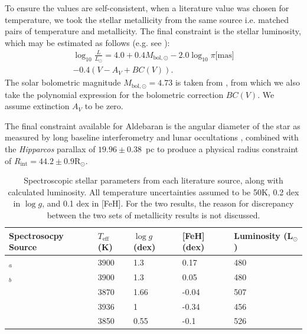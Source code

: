 \documentclass[modern]{aastex61}
\newcommand{\hipparcos}{\emph{Hipparcos}\xspace}
\begin{document}
To ensure the values are self-consistent, when a literature value was chosen for temperature, we took the stellar metallicity from the same source i.e. matched pairs of temperature and metallicity. The final constraint is the stellar luminosity, which may be estimated as follows (e.g. see \citealt{pijpers2003}):
\begin{multline}
\log_{10} \frac{L}{L_{\odot}} = 4.0+
0.4 M_{{\textrm{bol}},\odot} -2.0 \log_{10} {\pi [{\textrm{mas}]}} \\-0.4(V-A_V + BC(V)).
\label{eqn:lum}
\end{multline}
The solar bolometric magnitude $M_{\textrm{bol},\odot}=4.73$ is taken from \cite{Torres2010}, from which we also take the polynomial expression for the bolometric correction $BC(V)$. We assume extinction $A_V$ to be zero.

The final constraint available for Aldebaran is the angular diameter of the star as measured by long baseline interferometry and lunar occultations \citep[$20.58 \pm 0.03$ mas;][]{richichi2005,1979ApJ...228L.111B,brown1979,panek1980}, combined with the \hipparcos parallax of $19.96 \pm 0.38$~pc to produce a physical radius constraint of $R_{\textrm{int}}=44.2\pm0.9\textrm{R}_{\odot}$.

\begin{table}
	\centering
	\caption{Spectroscopic stellar parameters from each literature source, along with calculated luminosity. All temperature uncertainties assumed to be 50K, 0.2 dex in $\log{g}$, and 0.1 dex in [FeH]. For the two  results, the reason for discrepancy between the two sets of metallicity results is not discussed.}
	\label{tab:spec}
	\begin{tabular}{lllll} %
		\hline
		Spectrosocpy Source & $T_{\textrm{eff}}$ (K) & $\log{g}$ (dex) & [FeH] (dex) & Luminosity (L$_{\odot}$)\\
		\hline
		\cite{2012Sheffield}$_{a}$	&	3900	&	1.3	&	0.17	&	480\\
		\cite{2012Sheffield}$_{b}$	&	3900	&	1.3	&	0.05	&	480\\
		\cite{2011Prugniel}	&	3870 & 1.66 & -0.04 & 507\\
		\cite{2008Massarotti} & 3936 & 1 & -0.34 & 456\\
		\cite{2009Frasca} & 3850 & 0.55 & -0.1 & 526\\
		\hline
	\end{tabular}
\end{table}
\end{document}
